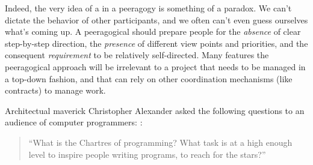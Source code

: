 Indeed, the very idea of a  in a peeragogy is
something of a paradox.  We can't dictate the behavior of other
participants, and we often can't even guess ourselves what's coming
up.  A peeragogical  should prepare people for
the \emph{absence} of clear step-by-step direction, the
\emph{presence} of different view points and priorities, and the
consequent \emph{requirement} to be relatively self-directed.  Many
features the peeragogical approach will be irrelevant to a project
that needs to be managed in a top-down fashion, and that can rely on
other coordination mechanisms (like contracts) to manage work.

Architectual maverick Christopher Alexander asked the following
questions to an audience of computer programmers:
\cite{alexander1999origins}:
\begin{quote}
``What is the Chartres of programming? What task is at a high enough level to inspire people writing programs, to reach for the stars?''
\end{quote}



